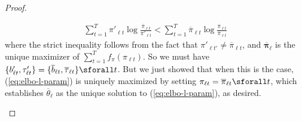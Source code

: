 \begin{proof}
\begin{enumerate}[label=\roman*.]
\begin{align*}
    \sum_{t=1}^T \pi'_{\ell t} \log \frac{\overline{\pi}_{\ell t}}{\pi'_{\ell t}} < \sum_{t=1}^T \overline{\pi}_{\ell t} \log \frac{\overline{\pi}_{\ell t}}{\overline{\pi}_{\ell t}} 
\end{align*}
where the strict inequality follows from the fact that $\pi'_{\ell t'} \neq \overline{\pi}_{\ell t}$, and $\overline{\boldsymbol{\pi}}_\ell$ is the unique maximizer of $\sum_{t=1}^T f_\pi(\pi_{\ell t})$. So we must have $ \{b'_{\ell t}, \tau'_{\ell t}\} = \{\overline{b}_{\ell t}, \overline{\tau}_{\ell t}\} \sforall t$. But we just showed that when this is the case, (\ref{eq:elbo-l-param}) is uniquely maximized by setting $\pi_{\ell t} = \overline{\pi}_{\ell t} \sforall t$, which establishes $\overline{\theta}_\ell$ as the unique solution to (\ref{eq:elbo-l-param}), as desired.


\end{enumerate}
\end{proof}
